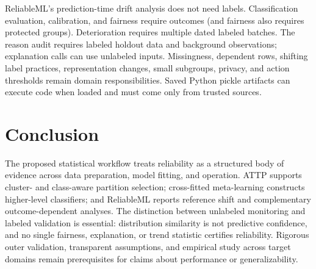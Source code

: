 \documentclass[conference]{IEEEtran}
\begin{document}
ReliableML's prediction-time drift analysis does not need labels. Classification evaluation, calibration, and fairness require outcomes (and fairness also requires protected groups). Deterioration requires multiple dated labeled batches. The reason audit requires labeled holdout data and background observations; explanation calls can use unlabeled inputs. Missingness, dependent rows, shifting label practices, representation changes, small subgroups, privacy, and action thresholds remain domain responsibilities. Saved Python pickle artifacts can execute code when loaded and must come only from trusted sources.

\section{Conclusion}
The proposed statistical workflow treats reliability as a structured body of evidence across data preparation, model fitting, and operation. ATTP supports cluster- and class-aware partition selection; cross-fitted meta-learning constructs higher-level classifiers; and ReliableML reports reference shift and complementary outcome-dependent analyses. The distinction between unlabeled monitoring and labeled validation is essential: distribution similarity is not predictive confidence, and no single fairness, explanation, or trend statistic certifies reliability. Rigorous outer validation, transparent assumptions, and empirical study across target domains remain prerequisites for claims about performance or generalizability.
\end{document}
